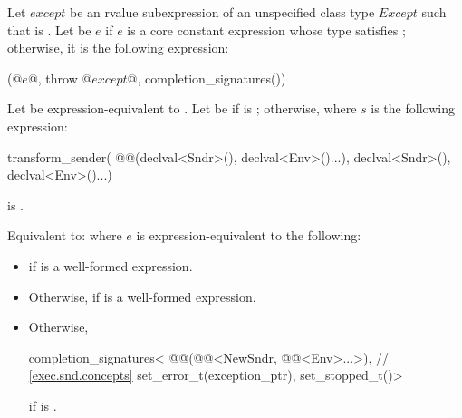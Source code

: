 \begin{itemdescr}
\pnum
Let $except$ be an rvalue subexpression of
an unspecified class type $Except$ such that
is .
Let  be $e$
if $e$ is a core constant expression whose
type satisfies ;
otherwise, it is the following expression:
\begin{codeblock}
(@$e$@, throw @$except$@, completion_signatures())
\end{codeblock}
Let 
be expression-equivalent to
.
Let  be 
if  is ;
otherwise, 
where $s$ is the following expression:
\begin{codeblock}
transform_sender(
  @@(declval<Sndr>(), declval<Env>()...),
  declval<Sndr>(),
  declval<Env>()...)
\end{codeblock}

\pnum
\constraints
{} is .

\pnum
\effects
Equivalent to: 
where $e$ is expression-equivalent to the following:
\begin{itemize}
\item
{}
if 
is a well-formed expression.

\item
Otherwise,
if 
is a well-formed expression.

\item
Otherwise,
\begin{codeblock}
completion_signatures<
  @@(@@<NewSndr, @@<Env>...>),   // \ref{exec.snd.concepts}
  set_error_t(exception_ptr),
  set_stopped_t()>
\end{codeblock}
if 
is .


\end{itemize}
\end{itemdescr}
